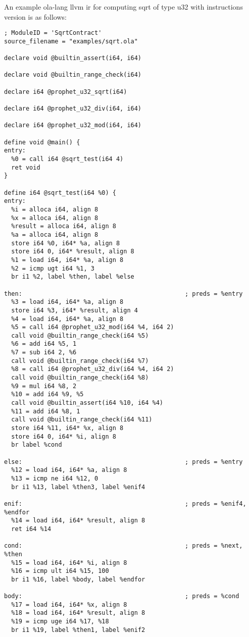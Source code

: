 An example ola-lang llvm ir for computing sqrt of type u32 with instructions version is as follows:
\begin{lstlisting}
; ModuleID = 'SqrtContract'
source_filename = "examples/sqrt.ola"

declare void @builtin_assert(i64, i64)

declare void @builtin_range_check(i64)

declare i64 @prophet_u32_sqrt(i64)

declare i64 @prophet_u32_div(i64, i64)

declare i64 @prophet_u32_mod(i64, i64)

define void @main() {
entry:
  %0 = call i64 @sqrt_test(i64 4)
  ret void
}

define i64 @sqrt_test(i64 %0) {
entry:
  %i = alloca i64, align 8
  %x = alloca i64, align 8
  %result = alloca i64, align 8
  %a = alloca i64, align 8
  store i64 %0, i64* %a, align 8
  store i64 0, i64* %result, align 8
  %1 = load i64, i64* %a, align 8
  %2 = icmp ugt i64 %1, 3
  br i1 %2, label %then, label %else

then:                                             ; preds = %entry
  %3 = load i64, i64* %a, align 8
  store i64 %3, i64* %result, align 4
  %4 = load i64, i64* %a, align 8
  %5 = call i64 @prophet_u32_mod(i64 %4, i64 2)
  call void @builtin_range_check(i64 %5)
  %6 = add i64 %5, 1
  %7 = sub i64 2, %6
  call void @builtin_range_check(i64 %7)
  %8 = call i64 @prophet_u32_div(i64 %4, i64 2)
  call void @builtin_range_check(i64 %8)
  %9 = mul i64 %8, 2
  %10 = add i64 %9, %5
  call void @builtin_assert(i64 %10, i64 %4)
  %11 = add i64 %8, 1
  call void @builtin_range_check(i64 %11)
  store i64 %11, i64* %x, align 8
  store i64 0, i64* %i, align 8
  br label %cond

else:                                             ; preds = %entry
  %12 = load i64, i64* %a, align 8
  %13 = icmp ne i64 %12, 0
  br i1 %13, label %then3, label %enif4

enif:                                             ; preds = %enif4, %endfor
  %14 = load i64, i64* %result, align 8
  ret i64 %14

cond:                                             ; preds = %next, %then
  %15 = load i64, i64* %i, align 8
  %16 = icmp ult i64 %15, 100
  br i1 %16, label %body, label %endfor

body:                                             ; preds = %cond
  %17 = load i64, i64* %x, align 8
  %18 = load i64, i64* %result, align 8
  %19 = icmp uge i64 %17, %18
  br i1 %19, label %then1, label %enif2


\end{lstlisting}
